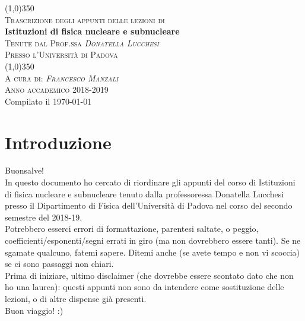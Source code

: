 \documentclass[12pt]{report} %
\makeatletter
\renewcommand{\@marginparreset}{%
  \reset@font\small
  \raggedright
  \slshape
  \@setminipage
}
\theoremstyle{plain}
\theoremstyle{definition}
\theoremstyle{remark}
\makeatother
\begin{document}
\setlength{\aboverulesep}{0pt}
\setlength{\belowrulesep}{0pt}
\setlength{\extrarowheight}{.75ex}
\begin{center}
                \line (1,0){350} \\
                \textsc{\normalsize Trascrizione degli appunti delle lezioni di}\\
                [0.25in]
                \huge{\bfseries Istituzioni di fisica nucleare e subnucleare}\\
                [2mm]
                \textsc{\normalsize Tenute dal Prof.ssa \textit{Donatella Lucchesi}}
                \vspace{-0.5em}\\
                \textsc{\normalsize Presso l'Università di Padova}\\
                \vspace{-1em}
                \line (1,0){350} \\
        [0.2cm]
        \textsc{\normalsize A cura di: \textit{Francesco Manzali}}\\
                \textsc{\normalsize Anno accademico 2018-2019}\\ 
        {\scriptsize Compilato il \today}
\end{center}


\makeatletter
\renewcommand{\@marginparreset}{%
  \reset@font\small
  \raggedright
  \slshape
  \@setminipage
}
\makeatother

\tableofcontents 
\clearpage
\chapter*{Introduzione}
Buonsalve!\\
In questo documento ho cercato di riordinare gli appunti del corso di Istituzioni di fisica nucleare e subnucleare tenuto dalla professoressa Donatella Lucchesi presso il Dipartimento di Fisica dell'Università di Padova nel corso del secondo semestre del 2018-19.\\
Potrebbero esserci errori di formattazione, parentesi saltate, o peggio, coefficienti/esponenti/segni errati in giro (ma non dovrebbero essere tanti). Se ne sgamate qualcuno, fatemi sapere. Ditemi anche (se avete tempo e non vi scoccia) se ci sono passaggi non chiari.\\
Prima di iniziare, ultimo disclaimer (che dovrebbe essere scontato dato che non ho una laurea): questi appunti non sono da intendere come sostituzione delle lezioni, o di altre dispense già presenti.\\
Buon viaggio! :)
\end{document}
